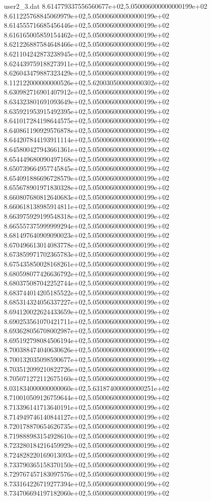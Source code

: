 \begin{filecontents}{user2_3.dat}
8.614779337556560677e+02,5.050006000000000199e+02
8.611225768845069979e+02,5.050006000000000199e+02
8.614555716685456446e+02,5.050006000000000199e+02
8.616165005859154462e+02,5.050006000000000199e+02
8.621226887584648466e+02,5.050006000000000199e+02
8.621104242873238945e+02,5.050006000000000199e+02
8.624439759188273911e+02,5.050006000000000199e+02
8.626043479887323429e+02,5.050006000000000199e+02
8.112122000000000526e+02,5.620030500000000302e+02
8.630982716901407912e+02,5.050006000000000199e+02
8.634323801691093649e+02,5.050006000000000199e+02
8.635921953915492395e+02,5.050006000000000199e+02
8.641017284198644575e+02,5.050006000000000199e+02
8.640861190929576878e+02,5.050006000000000199e+02
8.644207844193911114e+02,5.050006000000000199e+02
8.645800427943661361e+02,5.050006000000000199e+02
8.654449680090497168e+02,5.050006000000000199e+02
8.650739664957745845e+02,5.050006000000000199e+02
8.654091886696728579e+02,5.050006000000000199e+02
8.655678901971830328e+02,5.050006000000000199e+02
8.660807680812640683e+02,5.050006000000000199e+02
8.660618138985914811e+02,5.050006000000000199e+02
8.663975929199548318e+02,5.050006000000000199e+02
8.665557375999999294e+02,5.050006000000000199e+02
8.681497640909090023e+02,5.050006000000000199e+02
8.670496613014083778e+02,5.050006000000000199e+02
8.673859971702365783e+02,5.050006000000000199e+02
8.675435850028168261e+02,5.050006000000000199e+02
8.680598077426636792e+02,5.050006000000000199e+02
8.680375087042252744e+02,5.050006000000000199e+02
8.683744014205185522e+02,5.050006000000000199e+02
8.685314324056337227e+02,5.050006000000000199e+02
8.694120022624433659e+02,5.050006000000000199e+02
8.690253561070421711e+02,5.050006000000000199e+02
8.693628056708002987e+02,5.050006000000000199e+02
8.695192798084506194e+02,5.050006000000000199e+02
8.700388474040630626e+02,5.050006000000000199e+02
8.700132035098590677e+02,5.050006000000000199e+02
8.703512099210822726e+02,5.050006000000000199e+02
8.705071272112675160e+02,5.050006000000000199e+02
8.031834000000000060e+02,5.631874000000000251e+02
8.710010509126759644e+02,5.050006000000000199e+02
8.713396141713640191e+02,5.050006000000000199e+02
8.714949746140844127e+02,5.050006000000000199e+02
8.720178870654626735e+02,5.050006000000000199e+02
8.719888983154928610e+02,5.050006000000000199e+02
8.723280184216459929e+02,5.050006000000000199e+02
8.724828220169013093e+02,5.050006000000000199e+02
8.733790365158370150e+02,5.050006000000000199e+02
8.729767457183097576e+02,5.050006000000000199e+02
8.733164226719277394e+02,5.050006000000000199e+02
8.734706694197182060e+02,5.050006000000000199e+02

\end{filecontents}
